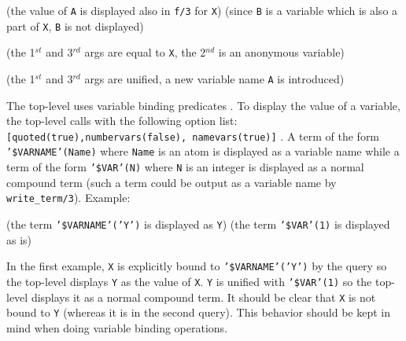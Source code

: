 \begin{CodeTwoCols}
\SkipLine
{} {(the value of \texttt{A} is displayed also in \texttt{f/3} for
\texttt{X})}
 {(since \texttt{B} is a variable which is also a part
of \texttt{X}, \texttt{B} is not displayed)}
\end{CodeTwoCols}

\begin{CodeTwoCols}
\SkipLine
{} {(the 1$^{st}$ and 3$^{rd}$ args are equal to \texttt{X},
the 2$^{nd}$ is an anonymous variable)}
\end{CodeTwoCols}

\begin{CodeTwoCols}
\SkipLine
{} {(the 1$^{st}$ and 3$^{rd}$ args are unified, a new
variable name \texttt{A} is introduced)}
\end{CodeTwoCols}

The top-level uses variable binding predicates . To display the value of a variable, the top-level calls
 with the following option list:
\texttt{[\texttt{quoted(true)},\texttt{numbervars(false)},
\texttt{namevars(true)}]} . A term of the
form \texttt{'\$VARNAME'(Name)} where \texttt{Name} is an atom is displayed
as a variable name while a term of the form \texttt{'\$VAR'(N)} where
\texttt{N} is an integer is displayed as a normal compound term (such a term
could be output as a variable name by \texttt{write\_term/3}). Example:

\begin{CodeTwoCols}
\SkipLine
{} {(the term \texttt{'\$VARNAME'('Y')} is displayed as \texttt{Y})}
 {(the term \texttt{'\$VAR'(1)} is displayed as is)}
\end{CodeTwoCols}

\begin{CodeTwoCols}
\SkipLine
{}
\end{CodeTwoCols}

In the first example, \texttt{X} is explicitly bound to
\texttt{'\$VARNAME'('Y')} by the query so the top-level displays \texttt{Y}
as the value of \texttt{X}. \texttt{Y} is unified with \texttt{'\$VAR'(1)} so
the top-level displays it as a normal compound term. It should be clear that
\texttt{X} is not bound to \texttt{Y} (whereas it is in the second
query). This behavior should be kept in mind when doing variable binding
operations.

